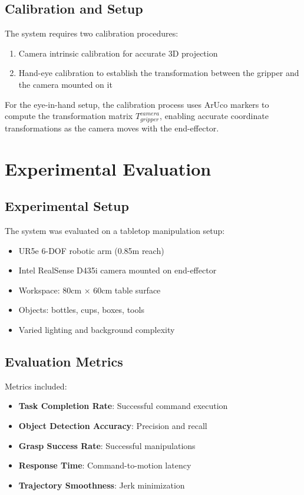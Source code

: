 \documentclass[conference]{IEEEtran}
\begin{document}
\subsection{Calibration and Setup}
The system requires two calibration procedures:
\begin{enumerate}
    \item Camera intrinsic calibration for accurate 3D projection
    \item Hand-eye calibration to establish the transformation between the gripper and the camera mounted on it
\end{enumerate}

For the eye-in-hand setup, the calibration process uses ArUco markers to compute the transformation matrix $T_{gripper}^{camera}$, enabling accurate coordinate transformations as the camera moves with the end-effector.

\section{Experimental Evaluation}

\subsection{Experimental Setup}
The system was evaluated on a tabletop manipulation setup:
\begin{itemize}
    \item UR5e 6-DOF robotic arm (0.85m reach)
    \item Intel RealSense D435i camera mounted on end-effector
    \item Workspace: 80cm × 60cm table surface
    \item Objects: bottles, cups, boxes, tools
    \item Varied lighting and background complexity
\end{itemize}

\subsection{Evaluation Metrics}
Metrics included:
\begin{itemize}
    \item \textbf{Task Completion Rate}: Successful command execution
    \item \textbf{Object Detection Accuracy}: Precision and recall
    \item \textbf{Grasp Success Rate}: Successful manipulations
    \item \textbf{Response Time}: Command-to-motion latency
    \item \textbf{Trajectory Smoothness}: Jerk minimization
\end{itemize}
\end{document}
